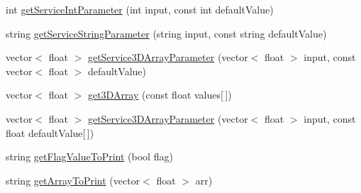 \begin{DoxyCompactItemize}
\item 
int \hyperlink{namespacesrvm_aca4253032e76670dd7e7b3c31fb59714}{get\-Service\-Int\-Parameter} (int input, const int default\-Value)
\item 
string \hyperlink{namespacesrvm_a26454c4e5c30136db86cb0aa0f5a91b0}{get\-Service\-String\-Parameter} (string input, const string default\-Value)
\item 
vector$<$ float $>$ \hyperlink{namespacesrvm_a40e6c519b06c6f44c4706e35ccd2b3dd}{get\-Service3\-D\-Array\-Parameter} (vector$<$ float $>$ input, const vector$<$ float $>$ default\-Value)
\item 
vector$<$ float $>$ \hyperlink{namespacesrvm_afd3f0061db924a7e0cbdfd06e2a7bb3c}{get3\-D\-Array} (const float values\mbox{[}$\,$\mbox{]})
\item 
vector$<$ float $>$ \hyperlink{namespacesrvm_a6fcb13a6186c7beda4a120b1a4f46313}{get\-Service3\-D\-Array\-Parameter} (vector$<$ float $>$ input, const float default\-Value\mbox{[}$\,$\mbox{]})
\item 
string \hyperlink{namespacesrvm_a0ceb768d016b217ced8c3d0b2a520862}{get\-Flag\-Value\-To\-Print} (bool flag)
\item 
string \hyperlink{namespacesrvm_a5796ceb6b857f7f21eb4f6056c251f00}{get\-Array\-To\-Print} (vector$<$ float $>$ arr)
\end{DoxyCompactItemize}
